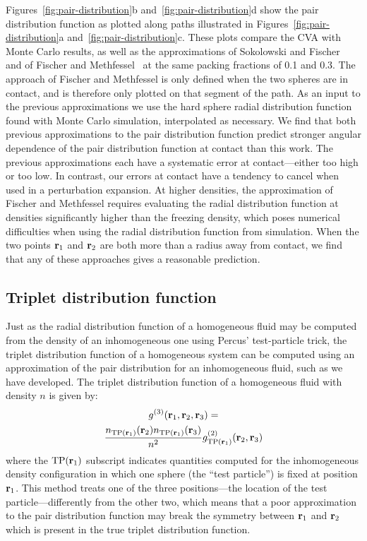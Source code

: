 Figures~\ref{fig:pair-distribution}b and~\ref{fig:pair-distribution}d
show the pair distribution function as plotted along paths illustrated
in Figures~\ref{fig:pair-distribution}a
and~\ref{fig:pair-distribution}c.  These plots compare the CVA with
Monte Carlo results, as well as the approximations of Sokolowski and
Fischer~\cite{sokolowski1992role} and of Fischer and
Methfessel~\cite{fischer1980born} at the same packing fractions of 0.1
and 0.3.  The approach of Fischer and Methfessel is only defined when
the two spheres are in contact, and is therefore only plotted on that
segment of the path.  As an input to the previous approximations we
use the hard sphere radial distribution function found with Monte
Carlo simulation, interpolated as necessary. We find that both
previous approximations to the pair distribution function predict
stronger angular dependence of the pair distribution function at
contact than this work.  The previous approximations each have a
systematic error at contact---either too high or too low.  In
contrast, our errors at contact have a tendency to cancel when used in
a perturbation expansion.  At higher densities, the approximation of
Fischer and Methfessel requires evaluating the radial distribution
function at densities significantly higher than the freezing density,
which poses numerical difficulties when using the radial distribution
function from simulation.  When the two points $\textbf{r}_1$ and $\textbf{r}_2$ are
both more than a radius away from contact, we find that any of these
approaches gives a reasonable prediction.

\subsection{Triplet distribution function}

Just as the radial distribution function of a homogeneous fluid may be
computed from the density of an inhomogeneous one using Percus'
test-particle trick, the triplet distribution function of a
homogeneous system can be computed using an approximation of the pair
distribution for an inhomogeneous fluid, such as we have
developed. The triplet distribution function of a homogeneous fluid
with density $n$ is given by:
\begin{multline}
    g^{(3)}(\textbf{r}_1,\textbf{r}_2,\textbf{r}_3) =\\
    \frac{n_{\textrm{TP}(\textbf{r}_1)}(\textbf{r}_2)
      n_{\textrm{TP}(\textbf{r}_1)}(\textbf{r}_3)}{n^2}
    g^{(2)}_{\textrm{TP}(\textbf{r}_1)}(\textbf{r}_2,\textbf{r}_3)
\end{multline}
where the $\textrm{TP}(\textbf{r}_1)$ subscript indicates quantities computed for
the inhomogeneous density configuration in which one sphere (the
``test particle'') is fixed
at position $\textbf{r}_1$.  This method treats one of the three
positions---the location of the test particle---differently from the
other two, which means that a poor approximation to the pair distribution
function may break the symmetry between $\textbf{r}_1$ and $\textbf{r}_2$ which is
present in the true triplet distribution function.

